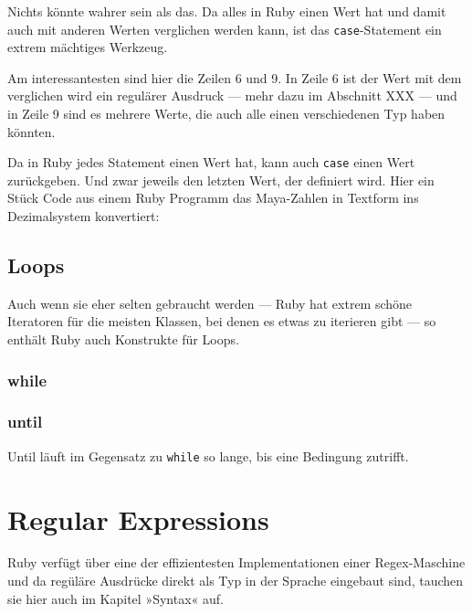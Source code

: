 \documentclass[a4book,11pt,twoside]{scrbook}
\begin{document}
Nichts könnte wahrer sein als das. Da alles in Ruby einen Wert hat und damit auch mit anderen Werten verglichen werden kann, ist das \texttt{case}-Statement ein extrem mächtiges Werkzeug.



Am interessantesten sind hier die Zeilen 6 und 9. In Zeile 6 ist der Wert mit dem verglichen wird ein regulärer Ausdruck — mehr dazu im Abschnitt XXX — und in Zeile 9 sind es mehrere Werte, die auch alle einen verschiedenen Typ haben könnten.


Da in Ruby jedes Statement einen Wert hat, kann auch \texttt{case} einen Wert zurückgeben. Und zwar jeweils den letzten Wert, der definiert wird. Hier ein Stück Code aus einem Ruby Programm das Maya-Zahlen in Textform ins Dezimalsystem konvertiert:





\subsection*{Loops} %
\label{sub:loops}
Auch wenn sie eher selten gebraucht werden — Ruby hat extrem schöne Iteratoren für die meisten Klassen, bei denen es etwas zu iterieren gibt — so enthält Ruby auch Konstrukte für Loops.

\subsubsection*{while} %
\label{ssub:while}


\subsubsection{until} %
\label{ssub:until}
Until läuft im Gegensatz zu \texttt{while} so lange, bis eine Bedingung zutrifft.





\section{Regular Expressions} %
\label{sec:regular_expressions}
Ruby verfügt über eine der effizientesten Implementationen einer Regex-Maschine und da regüläre Ausdrücke direkt als Typ in der Sprache eingebaut sind, tauchen sie hier auch im Kapitel »Syntax« auf.
\end{document}
